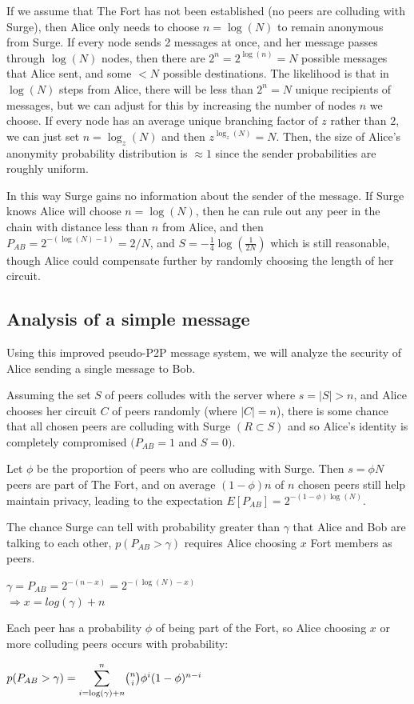 \documentclass[twocolumn,11pt,english]{article}
\begin{document}
If we assume that The Fort has not been established (no peers are colluding with Surge), then Alice only needs to choose $n = \log(N)$ to remain anonymous from Surge. If every node sends 2 messages at once, and her message passes through $\log(N)$ nodes, then there are $2^n = 2^{\log(n)} = N$ possible messages that Alice sent, and some $< N$ possible destinations. The likelihood is that in $\log(N)$ steps from Alice, there will be less than $2^n = N$ unique recipients of messages, but we can adjust for this by increasing the number of nodes $n$ we choose. If every node has an average unique branching factor of $z$ rather than $2$, we can just set $n = \log_z(N)$ and then $z^{\log_z(N)} = N$. Then, the size of Alice's anonymity probability distribution is $\approx 1$ since the sender probabilities are roughly uniform.

In this way Surge gains no information about the sender of the message. If Surge knows Alice will choose $n = \log(N)$, then he can rule out any peer in the chain with distance less than $n$ from Alice, and then $P_{AB} = 2^{-(\log(N)-1)} = 2/N$, and $S = - \frac{1}{4} \log(\frac{1}{2N})$ which is still reasonable, though Alice could compensate further by randomly choosing the length of her circuit. 

\subsection{Analysis of a simple message} 
Using this improved pseudo-P2P message system, we will analyze the security of Alice sending a single message to Bob.

Assuming the set $S$ of peers colludes with the server where $s = |S| > n$, and Alice chooses her circuit $C$ of peers randomly (where $|C| = n$), there is some chance that all chosen peers are colluding with Surge $(R \subset S)$ and so Alice's identity is completely compromised $(P_{AB} = 1$ and $S = 0)$. 

Let $\phi$ be the proportion of peers who are colluding with Surge. Then $s = \phi N$ peers are part of The Fort, and on average $(1 - \phi)n$ of $n$ chosen peers still help maintain privacy, leading to the expectation $E[P_{AB}] = 2^{-(1 - \phi) \log(N)}$. 

The chance Surge can tell with probability greater than $\gamma$ that Alice and Bob are talking to each other, $p(P_{AB} > \gamma)$ requires Alice choosing $x$ Fort members as peers. 
\begin{center}
$\gamma = P_{AB} = 2^{-(n - x)} = 2^{-(\log(N) - x)}$
\\ $ \Rightarrow x = log( \gamma ) + n$
\end{center}
Each peer has a probability $\phi$ of being part of the Fort, so Alice choosing $x$ or more colluding peers occurs with probability:
\begin{center}
 $p(P_{AB} > \gamma) = \mathlarger{\sum}\limits_{i=\log(\gamma) + n}^n {n \choose i} \phi^i (1 - \phi )^{n-i}$

\end{center}
\end{document}
